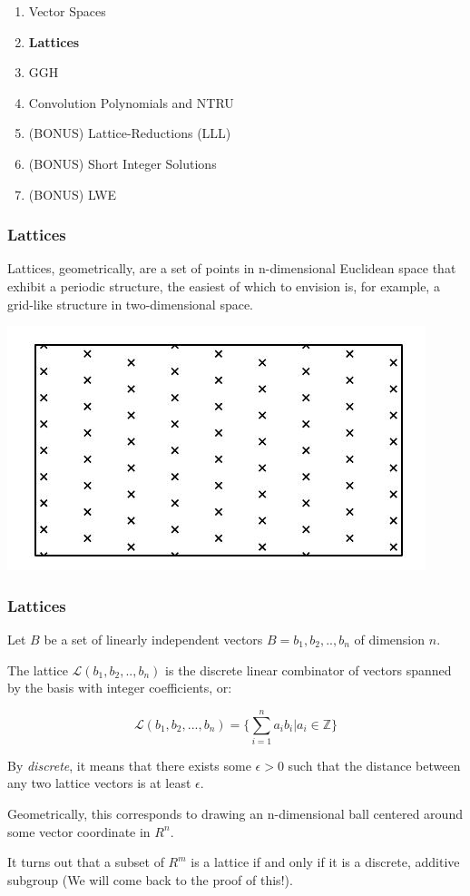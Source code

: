 \documentclass{beamer}
\begin{document}
\begin{frame}
\begin{enumerate}
\item Vector Spaces
\item \textbf{Lattices}
\item GGH
\item Convolution Polynomials and NTRU
\item (BONUS) Lattice-Reductions (LLL)
\item (BONUS) Short Integer Solutions
\item (BONUS) LWE
\end{enumerate}
\end{frame}

\begin{frame}
\frametitle{Lattices}

Lattices, geometrically, are a set of points in n-dimensional Euclidean space that exhibit a periodic structure, the easiest of which to envision is, for example, a grid-like structure in two-dimensional space.

\begin{center}
\includegraphics[scale=0.5]{Lattice-in-r2.jpeg}
\end{center}



\end{frame}

\begin{frame}
\frametitle{Lattices}
Let $B$ be a set of linearly independent vectors $B = {b_1, b_2, .., b_n}$ of dimension $n$.

The lattice $\mathcal{L}(b_1, b_2, .., b_n)$ 	is the discrete linear combinator of vectors spanned by the basis with integer coefficients, or:

\[ \mathcal{L}(b_1, b_2,..., b_n) = \big\{ \sum_{i=1}^n a_i b_i | a_i \in \mathbb{Z} \big\} \]

By \textit{discrete}, it means that there exists some $\epsilon > 0$ such that the distance between any two lattice vectors is at least $\epsilon$.

Geometrically, this corresponds to drawing an n-dimensional ball centered around some vector coordinate in $R^n$. 

It turns out that a subset of $R^m$ is a lattice if and only if it is a discrete, additive subgroup (We will come back to the proof of this!).

\end{frame}
\end{document}
